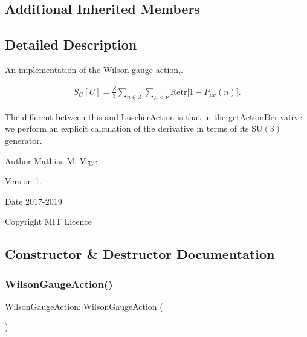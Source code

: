 \subsection*{Additional Inherited Members}


\subsection{Detailed Description}
An implementation of the Wilson gauge action,. 

\begin{eqnarray*} S_G[U] = \frac{\beta}{3} \sum_{n\in\Lambda} \sum_{\mu<\nu} \mathrm{Re} \mathrm{tr} \big[ 1 - P_{\mu\nu}(n) \big]. \end{eqnarray*}

The different between this and \mbox{\hyperlink{class_luscher_action}{Luscher\+Action}} is that in the get\+Action\+Derivative we perform an explicit calculation of the derivative in terms of its $\mathrm{SU}(3)$ generator.

\begin{DoxyAuthor}{Author}
Mathias M. Vege 
\end{DoxyAuthor}
\begin{DoxyVersion}{Version}
1. 
\end{DoxyVersion}
\begin{DoxyDate}{Date}
2017-\/2019 
\end{DoxyDate}
\begin{DoxyCopyright}{Copyright}
M\+IT Licence 
\end{DoxyCopyright}


\subsection{Constructor \& Destructor Documentation}
\mbox{\label{class_wilson_gauge_action_a50d06446cf93f7e738e88c372920f518}} 
\subsubsection{\texorpdfstring{WilsonGaugeAction()}{WilsonGaugeAction()}}
{\footnotesize\ttfamily Wilson\+Gauge\+Action\+::\+Wilson\+Gauge\+Action (\begin{DoxyParamCaption}{ }\end{DoxyParamCaption})}

